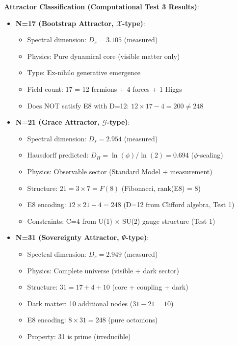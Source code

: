 \documentclass[12pt,a4paper]{article}
\begin{document}
\textbf{Attractor Classification (Computational Test 3 Results)}:

\begin{itemize}
\item \textbf{N=17 (Bootstrap Attractor, $\mathcal{X}$-type)}: 
  \begin{itemize}
  \item Spectral dimension: $D_s = 3.105$ (measured)
  \item Physics: Pure dynamical core (visible matter only)
  \item Type: Ex-nihilo generative emergence
  \item Field count: 17 = 12 fermions + 4 forces + 1 Higgs
  \item Does NOT satisfy E8 with D=12: $12 \times 17 - 4 = 200 \neq 248$
  \end{itemize}

\item \textbf{N=21 (Grace Attractor, $\mathcal{G}$-type)}:
  \begin{itemize}
  \item Spectral dimension: $D_s = 2.954$ (measured)
  \item Hausdorff predicted: $D_H = \ln(\phi)/\ln(2) = 0.694$ ($\phi$-scaling)
  \item Physics: Observable sector (Standard Model + measurement)
  \item Structure: $21 = 3 \times 7 = F(8)$ (Fibonacci, rank(E8) = 8)
  \item E8 encoding: $12 \times 21 - 4 = 248$ (D=12 from Clifford algebra, Test 1)
  \item Constraints: C=4 from U(1) $\times$ SU(2) gauge structure (Test 1)
  \end{itemize}

\item \textbf{N=31 (Sovereignty Attractor, $\Psi$-type)}:
  \begin{itemize}
  \item Spectral dimension: $D_s = 2.949$ (measured)
  \item Physics: Complete universe (visible + dark sector)
  \item Structure: $31 = 17 + 4 + 10$ (core + coupling + dark)
  \item Dark matter: 10 additional nodes ($31 - 21 = 10$)
  \item E8 encoding: $8 \times 31 = 248$ (pure octonions)
  \item Property: 31 is prime (irreducible)
  \end{itemize}
\end{itemize}
\end{document}
